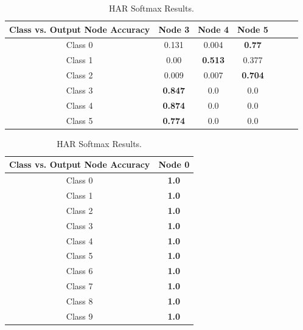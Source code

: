\documentclass[journal]{IEEEtran}
\begin{document}
  \begin{table}[!ht]
    \renewcommand{\arraystretch}{1.3}
    \caption{HAR Softmax Results.}
    \label{tab_har_sfx}
    \centering
    \begin{tabular}{|c|c|c|c|c|c|c|}
    \hline
    Class vs. Output Node Accuracy & Node 3 & Node 4 & Node 5\\
    \hline
    \hline
    Class 0    & 0.131  &  0.004    & \textbf{0.77}\\
    \hline
    Class 1    & 0.00  &  \textbf{0.513}    & 0.377\\
    \hline
    Class 2   & 0.009  &  0.007    & \textbf{0.704}\\
    \hline
    Class 3   & \textbf{0.847}  &  0.0    & 0.0\\
    \hline
    Class 4  & \textbf{0.874 } &  0.0    & 0.0\\
    \hline
    Class 5    & \textbf{0.774  }&  0.0    & 0.0\\
    \hline
    \end{tabular}
    \end{table}
    \begin{table}
      \renewcommand{\arraystretch}{1.3}
      \caption{HAR Softmax Results.}
      \label{tab_har_sfx_all}
      \centering
      \begin{tabular}{|c|c|}
      \hline
      Class vs. Output Node Accuracy & Node 0 \\
      \hline
      \hline
      Class 0   &  \textbf{1.0}   \\
      \hline
      Class 1   &  \textbf{1.0}   \\
      \hline
      Class 2   &  \textbf{1.0}   \\
      \hline
      Class 3   &  \textbf{1.0}  \\
      \hline
      Class 4   &  \textbf{1.0}  \\
      \hline
      Class 5   &  \textbf{1.0}  \\
      \hline
      Class 6   &  \textbf{1.0}   \\
      \hline
      Class 7   &  \textbf{1.0}  \\
      \hline
      Class 8   &  \textbf{1.0}  \\
      \hline
      Class 9   &  \textbf{1.0}  \\
      \hline
      \end{tabular}
      \end{table}
\end{document}

